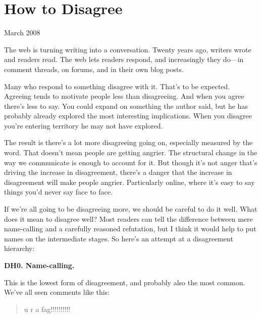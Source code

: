 \chapter{How to Disagree}


            
              
                

March 2008

The web is turning writing into a
                  conversation. Twenty years ago, writers wrote and readers
                  read. The web lets readers respond, and increasingly they
                  do---in comment threads, on forums, and in their own blog
                  posts.

Many who respond to something disagree with
                  it. That's to be expected. Agreeing tends to motivate people
                  less than disagreeing. And when you agree there's less to say.
                  You could expand on something the author said, but he has
                  probably already explored the most interesting implications.
                  When you disagree you're entering territory he may not have
                  explored.

The result is there's a lot more
                  disagreeing going on, especially measured by the word. That
                  doesn't mean people are getting angrier. The structural change
                  in the way we communicate is enough to account for it. But
                  though it's not anger that's driving the increase in
                  disagreement, there's a danger that the increase in
                  disagreement will make people angrier. Particularly online,
                  where it's easy to say things you'd never say face to face.

If
                  we're all going to be disagreeing more, we should be careful
                  to do it well. What does it mean to disagree well? Most
                  readers can tell the difference between mere name-calling and
                  a carefully reasoned refutation, but I think it would help to
                  put names on the intermediate stages. So here's an attempt at
                  a disagreement hierarchy:


                  \textbf{DH0. Name-calling.}

This is the lowest form
                  of disagreement, and probably also the most common. We've all
                  seen comments like this:
                  \begin{quote}
u r a fag!!!!!!!!!!
\end{quote}

